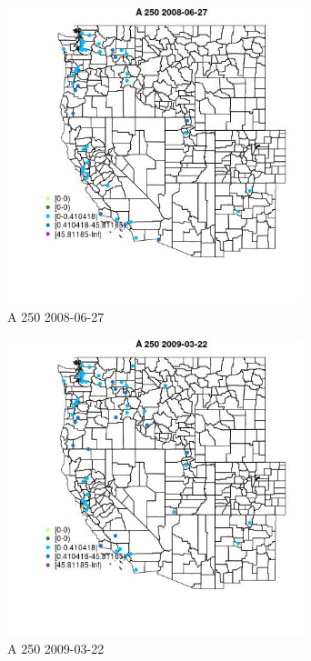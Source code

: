 \begin{figure} 
\centering  
\includegraphics[width=0.77\textwidth]{Code_Outputs/Report_ML_input_PM25_Step4_part_e_de_duplicated_aves_MapObsA_2502008-06-27.jpg} 
\caption{\label{fig:Report_ML_input_PM25_Step4_part_e_de_duplicated_avesMapObsA_2502008-06-27}A 250 2008-06-27} 
\end{figure} 
 

\begin{figure} 
\centering  
\includegraphics[width=0.77\textwidth]{Code_Outputs/Report_ML_input_PM25_Step4_part_e_de_duplicated_aves_MapObsA_2502009-03-22.jpg} 
\caption{\label{fig:Report_ML_input_PM25_Step4_part_e_de_duplicated_avesMapObsA_2502009-03-22}A 250 2009-03-22} 
\end{figure} 
 

